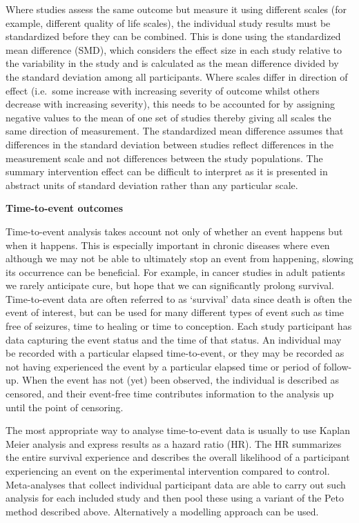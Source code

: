 \documentclass[
  11pt,
  a4paper,
  DIV=11,
  numbers=noendperiod]{scrreprt}
\begin{document}
Where studies assess the same outcome but measure it using different
scales (for example, different quality of life scales), the individual
study results must be standardized before they can be combined. This is
done using the standardized mean difference (SMD), which considers the
effect size in each study relative to the variability in the study and
is calculated as the mean difference divided by the standard deviation
among all participants. Where scales differ in direction of effect
(i.e.~some increase with increasing severity of outcome whilst others
decrease with increasing severity), this needs to be accounted for by
assigning negative values to the mean of one set of studies thereby
giving all scales the same direction of measurement. The standardized
mean difference assumes that differences in the standard deviation
between studies reflect differences in the measurement scale and not
differences between the study populations. The summary intervention
effect can be difficult to interpret as it is presented in abstract
units of standard deviation rather than any particular scale.

\textbf{Time-to-event outcomes}

Time-to-event analysis takes account not only of whether an event
happens but when it happens. This is especially important in chronic
diseases where even although we may not be able to ultimately stop an
event from happening, slowing its occurrence can be beneficial. For
example, in cancer studies in adult patients we rarely anticipate cure,
but hope that we can significantly prolong survival. Time-to-event data
are often referred to as `survival' data since death is often the event
of interest, but can be used for many different types of event such as
time free of seizures, time to healing or time to conception. Each study
participant has data capturing the event status and the time of that
status. An individual may be recorded with a particular elapsed
time-to-event, or they may be recorded as not having experienced the
event by a particular elapsed time or period of follow-up. When the
event has not (yet) been observed, the individual is described as
censored, and their event-free time contributes information to the
analysis up until the point of censoring.

The most appropriate way to analyse time-to-event data is usually to use
Kaplan Meier analysis and express results as a hazard ratio (HR). The HR
summarizes the entire survival experience and describes the overall
likelihood of a participant experiencing an event on the experimental
intervention compared to control. Meta-analyses that collect individual
participant data are able to carry out such analysis for each included
study and then pool these using a variant of the Peto method described
above. Alternatively a modelling approach can be used.
\end{document}

